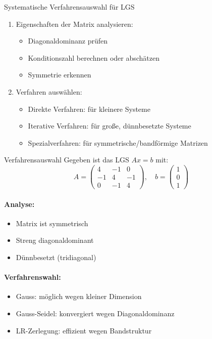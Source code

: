 \begin{KR}{Systematische Verfahrensauswahl für LGS}
\begin{enumerate}
    \item Eigenschaften der Matrix analysieren:
    \begin{itemize}
        \item Diagonaldominanz prüfen
        \item Konditionszahl berechnen oder abschätzen 
        \item Symmetrie erkennen
    \end{itemize}
    
    \item Verfahren auswählen:
    \begin{itemize}
        \item Direkte Verfahren: für kleinere Systeme
        \item Iterative Verfahren: für große, dünnbesetzte Systeme
        \item Spezialverfahren: für symmetrische/bandförmige Matrizen
    \end{itemize}
\end{enumerate}
\end{KR}

\begin{example2}{Verfahrensauswahl}
Gegeben ist das LGS $Ax = b$ mit:
$$A = \begin{pmatrix} 
4 & -1 & 0 \\
-1 & 4 & -1 \\
0 & -1 & 4
\end{pmatrix}, \quad b = \begin{pmatrix} 1 \\ 0 \\ 1 \end{pmatrix}$$

\paragraph{Analyse:}
\begin{itemize}
    \item Matrix ist symmetrisch
    \item Streng diagonaldominant
    \item Dünnbesetzt (tridiagonal)
\end{itemize}

\paragraph{Verfahrenswahl:}
\begin{itemize}
    \item Gauss: möglich wegen kleiner Dimension
    \item Gauss-Seidel: konvergiert wegen Diagonaldominanz
    \item LR-Zerlegung: effizient wegen Bandstruktur
\end{itemize}
\end{example2}

